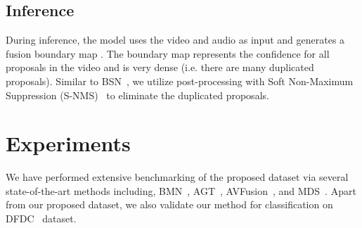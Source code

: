 \documentclass[conference, a4paper]{IEEEtran}
\makeatletter
\newcommand*{\ie}{i.e.\@\xspace}
\makeatother
\begin{document}
\begin{table*}
\centering
\caption{\textbf{Temporal forgery localization results on the subset (see Section~\ref{sec:experiments} for details) of the proposed dataset.} The visual-only version of the proposed method uses the output from the video boundary matching layer (see Figure~\ref{fig:model} for details), showing the performance when using only the video modality.}
\label{tab:subset}
\end{table*}    

\subsection{Inference}
During inference, the model uses the video and audio as input and generates a fusion boundary map . The boundary map represents the confidence for all proposals in the video and is very dense (\ie there are many duplicated proposals). Similar to BSN~\cite{lin_bsn_2018}, we utilize post-processing with Soft Non-Maximum Suppression (S-NMS)~\cite{bodla_soft-nms_2017} to eliminate the duplicated proposals.

\section{Experiments}
\label{sec:experiments}
We have performed extensive benchmarking of the proposed dataset via several state-of-the-art methods including, BMN~\cite{lin_bmn_2019}, AGT~\cite{nawhal_activity_2021}, AVFusion~\cite{bagchi_hear_2021}, and MDS~\cite{chugh_not_2020}. Apart from our proposed dataset, we also validate our method for classification on DFDC~\cite{dolhansky_deepfake_2020} dataset.
\end{document}
